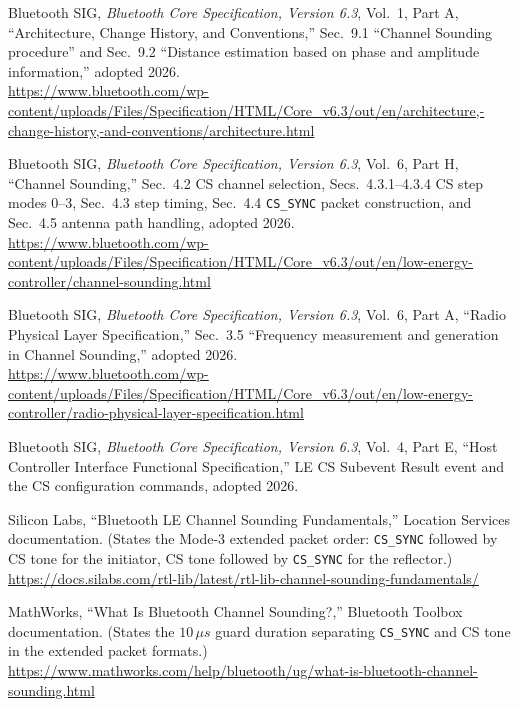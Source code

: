 \documentclass[11pt,a4paper]{article}
\newcommand{\us}{\,\ensuremath{\upmu}s}
\newcommand{\code}[1]{\texttt{\small #1}}
\providecommand{\upmu}{\mu}
\begin{document}
\begin{enumerate}[label={[\arabic*]},leftmargin=2.2em,itemsep=3pt]
\item Bluetooth SIG, \emph{Bluetooth Core Specification, Version 6.3}, Vol.\ 1, Part A,
  ``Architecture, Change History, and Conventions,'' Sec.\ 9.1 ``Channel Sounding procedure'' and
  Sec.\ 9.2 ``Distance estimation based on phase and amplitude information,'' adopted 2026.\\
  {\small\url{https://www.bluetooth.com/wp-content/uploads/Files/Specification/HTML/Core_v6.3/out/en/architecture,-change-history,-and-conventions/architecture.html}}

\item Bluetooth SIG, \emph{Bluetooth Core Specification, Version 6.3}, Vol.\ 6, Part H,
  ``Channel Sounding,'' Sec.\ 4.2 CS channel selection, Secs.\ 4.3.1--4.3.4 CS step modes 0--3,
  Sec.\ 4.3 step timing, Sec.\ 4.4 \code{CS\_SYNC} packet construction, and Sec.\ 4.5 antenna path
  handling, adopted 2026.\\
  {\small\url{https://www.bluetooth.com/wp-content/uploads/Files/Specification/HTML/Core_v6.3/out/en/low-energy-controller/channel-sounding.html}}

\item Bluetooth SIG, \emph{Bluetooth Core Specification, Version 6.3}, Vol.\ 6, Part A,
  ``Radio Physical Layer Specification,'' Sec.\ 3.5 ``Frequency measurement and generation in
  Channel Sounding,'' adopted 2026.\\
  {\small\url{https://www.bluetooth.com/wp-content/uploads/Files/Specification/HTML/Core_v6.3/out/en/low-energy-controller/radio-physical-layer-specification.html}}

\item Bluetooth SIG, \emph{Bluetooth Core Specification, Version 6.3}, Vol.\ 4, Part E,
  ``Host Controller Interface Functional Specification,'' LE CS Subevent Result event and the CS
  configuration commands, adopted 2026.

\item Silicon Labs, ``Bluetooth LE Channel Sounding Fundamentals,'' Location Services
  documentation. (States the Mode-3 extended packet order: \code{CS\_SYNC} followed by CS tone for
  the initiator, CS tone followed by \code{CS\_SYNC} for the reflector.)\\
  {\small\url{https://docs.silabs.com/rtl-lib/latest/rtl-lib-channel-sounding-fundamentals/}}

\item MathWorks, ``What Is Bluetooth Channel Sounding?,'' Bluetooth Toolbox documentation.
  (States the $10\us$ guard duration separating \code{CS\_SYNC} and CS tone in the extended packet
  formats.)\\
  {\small\url{https://www.mathworks.com/help/bluetooth/ug/what-is-bluetooth-channel-sounding.html}}


\end{enumerate}
\end{document}
